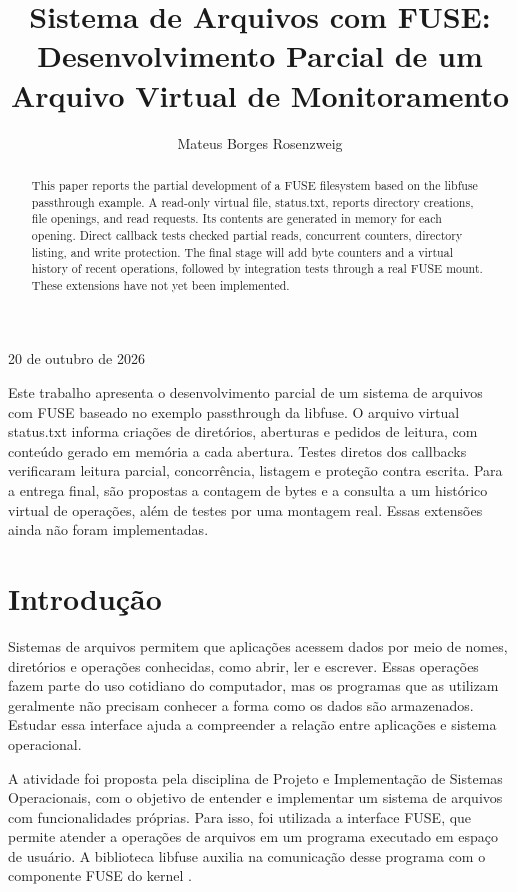 \documentclass[12pt]{article}
\date{\datadotrabalho}
\title{Sistema de Arquivos com FUSE: Desenvolvimento Parcial de um Arquivo Virtual de Monitoramento}
\author{Mateus Borges Rosenzweig\inst{1}}
\newcommand{\datadotrabalho}{20 de outubro de 2026}
\begin{document}
\maketitle
\begin{center}
\small \datadotrabalho
\end{center}

\begin{abstract}
This paper reports the partial development of a FUSE filesystem based
on the libfuse passthrough example. A read-only virtual file, status.txt,
reports directory creations, file openings, and read requests. Its contents
are generated in memory for each opening. Direct callback tests checked
partial reads, concurrent counters, directory listing, and write protection.
The final stage will add byte counters and a virtual history of recent
operations, followed by integration tests through a real FUSE mount.
These extensions have not yet been implemented.
\end{abstract}

\begin{resumo}
Este trabalho apresenta o desenvolvimento parcial de um sistema de
arquivos com FUSE baseado no exemplo passthrough da libfuse. O arquivo
virtual status.txt informa criações de diretórios, aberturas e pedidos de
leitura, com conteúdo gerado em memória a cada abertura. Testes diretos
dos callbacks verificaram leitura parcial, concorrência, listagem e
proteção contra escrita. Para a entrega final, são propostas a contagem
de bytes e a consulta a um histórico virtual de operações, além de testes
por uma montagem real. Essas extensões ainda não foram implementadas.
\end{resumo}

\section{Introdução}

Sistemas de arquivos permitem que aplicações acessem dados por meio de
nomes, diretórios e operações conhecidas, como abrir, ler e escrever.
Essas operações fazem parte do uso cotidiano do computador, mas os
programas que as utilizam geralmente não precisam conhecer a forma como
os dados são armazenados. Estudar essa interface ajuda a compreender a
relação entre aplicações e sistema operacional.

A atividade foi proposta pela disciplina de Projeto e Implementação
de Sistemas Operacionais, com o objetivo de entender e implementar um
sistema de arquivos com funcionalidades próprias. Para isso, foi utilizada
a interface FUSE, que permite atender a operações de arquivos em um
programa executado em espaço de usuário. A biblioteca libfuse auxilia
na comunicação desse programa com o componente FUSE do kernel
\cite{libfuse}.
\end{document}
